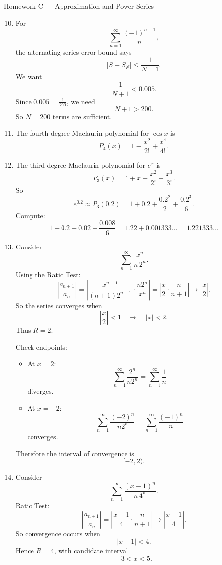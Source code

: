 \documentclass[11pt]{article}
\begin{document}
\begin{theorybox}{Homework C --- Approximation and Power Series}
\begin{enumerate}
\setcounter{enumi}{9}
    \item
    For
    \[
    \sum_{n=1}^{\infty}\frac{(-1)^{n-1}}{n},
    \]
    the alternating-series error bound says
    \[
    |S-S_N|\le \frac{1}{N+1}.
    \]
    We want
    \[
    \frac{1}{N+1}<0.005.
    \]
    Since \(0.005=\frac{1}{200}\), we need
    \[
    N+1>200.
    \]
    So \(N=200\) terms are sufficient.

    \item
    The fourth-degree Maclaurin polynomial for \(\cos x\) is
    \[
    P_4(x)=1-\frac{x^2}{2!}+\frac{x^4}{4!}.
    \]

    \item
    The third-degree Maclaurin polynomial for \(e^x\) is
    \[
    P_3(x)=1+x+\frac{x^2}{2!}+\frac{x^3}{3!}.
    \]
    So
    \[
    e^{0.2}\approx P_3(0.2)
    =1+0.2+\frac{0.2^2}{2}+\frac{0.2^3}{6}.
    \]
    Compute:
    \[
    1+0.2+0.02+\frac{0.008}{6}
    =1.22+0.001333\ldots
    =1.221333\ldots
    \]

    \item
    Consider
    \[
    \sum_{n=1}^{\infty}\frac{x^n}{n\,2^n}.
    \]
    Using the Ratio Test:
    \[
    \left|\frac{a_{n+1}}{a_n}\right|
    =
    \left|
    \frac{x^{n+1}}{(n+1)2^{n+1}}
    \cdot
    \frac{n2^n}{x^n}
    \right|
    =
    \left|\frac{x}{2}\cdot\frac{n}{n+1}\right|
    \to \left|\frac{x}{2}\right|.
    \]
    So the series converges when
    \[
    \left|\frac{x}{2}\right|<1
    \quad\Longrightarrow\quad
    |x|<2.
    \]
    Thus \(R=2\).

    Check endpoints:
    \begin{itemize}
        \item At \(x=2\):
        \[
        \sum_{n=1}^{\infty}\frac{2^n}{n2^n}
        =
        \sum_{n=1}^{\infty}\frac1n
        \]
        diverges.
        \item At \(x=-2\):
        \[
        \sum_{n=1}^{\infty}\frac{(-2)^n}{n2^n}
        =
        \sum_{n=1}^{\infty}\frac{(-1)^n}{n}
        \]
        converges.
    \end{itemize}
    Therefore the interval of convergence is
    \[
    [-2,2).
    \]

    \item
    Consider
    \[
    \sum_{n=1}^{\infty}\frac{(x-1)^n}{n\,4^n}.
    \]
    Ratio Test:
    \[
    \left|\frac{a_{n+1}}{a_n}\right|
    =
    \left|\frac{x-1}{4}\cdot\frac{n}{n+1}\right|
    \to \left|\frac{x-1}{4}\right|.
    \]
    So convergence occurs when
    \[
    |x-1|<4.
    \]
    Hence \(R=4\), with candidate interval
    \[
    -3<x<5.
    \]


\end{enumerate}
\end{theorybox}
\end{document}

